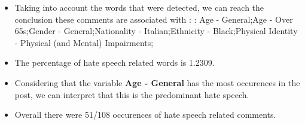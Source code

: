 \documentclass[11pt]{article}
\begin{document}
\begin{itemize}\item Taking into account the words that were detected, we can reach the conclusion these comments are associated with : : Age - General;Age - Over 65s;Gender - General;Nationality - Italian;Ethnicity - Black;Physical Identity - Physical (and Mental) Impairments;%

\item The percentage of hate speech related words is 1.2309.

\item Considering that the variable \textbf{Age - General} has the most occurences in the post, we can interpret that this is the predominant hate speech.

\item Overall there were 51/108 occurences of hate speech related comments.\end{itemize}
\end{document}
